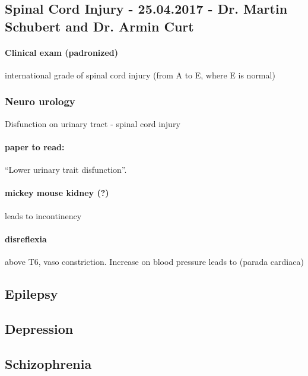 \documentclass[12pt,article,oneside,a4paper]{memoir}
\begin{document}
\subsection{Spinal Cord Injury - 25.04.2017 - Dr. Martin Schubert and Dr. Armin Curt}

\paragraph{Clinical exam (padronized)} international grade of spinal cord injury (from A to E, where E is normal)

\subsubsection{Neuro urology}
Disfunction on urinary tract - spinal cord injury
\paragraph{paper to read:} ``Lower urinary trait disfunction''.

\paragraph{mickey mouse kidney (?)} leads to incontinency

\paragraph{disreflexia}  above T6, vaso constriction. Increase on blood pressure leads to (parada cardiaca)

\subsection{Epilepsy}
 
\subsection{Depression}

\subsection{Schizophrenia}

\end{document}
